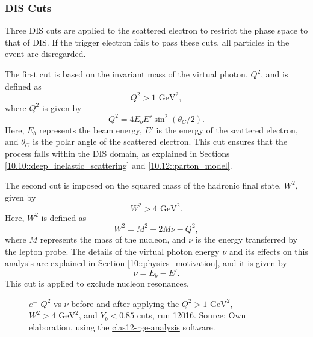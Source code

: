 \subsubsection{DIS Cuts}
\label{13.23::dis_cuts}
    Three DIS cuts are applied to the scattered electron to restrict the phase space to that of DIS.
    If the trigger electron fails to pass these cuts, all particles in the event are disregarded.

    The first cut is based on the invariant mass of the virtual photon, $Q^2$, and is defined as
    \begin{equation*}
        Q^2 > 1 \text{ GeV}^2,
    \end{equation*}
    where $Q^2$ is given by
    \begin{equation}
        Q^2 = 4E_bE'\sin^2(\theta_C/2).
        \label{eq::13.23::q2}
    \end{equation}
    Here, $E_b$ represents the beam energy, $E'$ is the energy of the scattered electron, and $\theta_C$ is the polar angle of the scattered electron.
    This cut ensures that the process falls within the DIS domain, as explained in Sections \ref{10.10::deep_inelastic_scattering} and \ref{10.12::parton_model}.

    The second cut is imposed on the squared mass of the hadronic final state, $W^2$, given by
    \begin{equation*}
        W^2 > 4 \text{ GeV}^2.
    \end{equation*}
    Here, $W^2$ is defined as
    \begin{equation*}
    W^2 = M^2 + 2M\nu - Q^2,
    \end{equation*}
    where $M$ represents the mass of the nucleon, and $\nu$ is the energy transferred by the lepton probe.
    The details of the virtual photon energy $\nu$ and its effects on this analysis are explained in Section \ref{10::physics_motivation}, and it is given by
    \begin{equation}
        \nu = E_b - E'.
        \label{eq::13.23::nu}
    \end{equation}
    This cut is applied to exclude nucleon resonances.

    \begin{figure}[b!]
        \centering{}
        \caption[$Q^2$ vs $\nu$ comparison]{$e^-$ $Q^2$ vs $\nu$ before and after applying the $Q^2 > 1 \text{ GeV}^2$, $W^2 > 4 \text{ GeV}^2$, and $Y_b < 0.85$ cuts, run 12016.
        Source: Own elaboration, using the \href{https://github.com/bleaktwig/clas12-rge-analysis}{clas12-rge-analysis} software.}
        \label{fig::13.23::q2_vs_nu}
    \end{figure}

